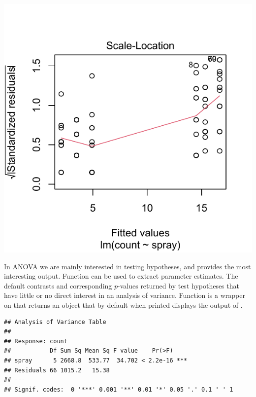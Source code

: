 \documentclass[krantz2]{krantz}\usepackage{knitr}
\begin{document}
\begin{knitrout}\footnotesize
{}\color{fgcolor}\begin{kframe}
\begin{alltt}
  \hlstd{=} \hlstd{)}
\end{alltt}
\end{kframe}

{\centering \includegraphics[width=.54\textwidth]{figure/pos-model-6a-1} 

}


\end{knitrout}

In ANOVA we are mainly interested in testing hypotheses, and  provides the most interesting output. Function  can be used to extract parameter estimates. The default contrasts and corresponding $p$-values returned by  test hypotheses that have little or no direct interest in an analysis of variance. Function  is a wrapper on  that returns an object that by default when printed displays the output of .

\begin{knitrout}\footnotesize
{}\color{fgcolor}\begin{kframe}
\begin{alltt}
\end{alltt}
\begin{verbatim}
## Analysis of Variance Table
## 
## Response: count
##           Df Sum Sq Mean Sq F value    Pr(>F)    
## spray      5 2668.8  533.77  34.702 < 2.2e-16 ***
## Residuals 66 1015.2   15.38                      
## ---
## Signif. codes:  0 '***' 0.001 '**' 0.01 '*' 0.05 '.' 0.1 ' ' 1
\end{verbatim}
\end{kframe}
\end{knitrout}
\end{document}
